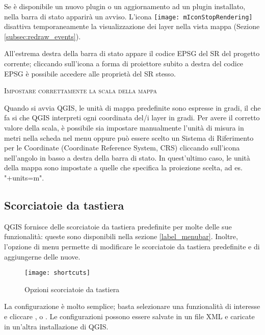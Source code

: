 Se è disponibile un nuovo plugin o un aggiornamento ad un plugin installato,
nella barra di stato apparirà un avviso. 
L'icona \texttt{[image: mIconStopRendering]} disattiva temporaneamente 
la visualizzazione dei layer nella vista mappa (Sezione \ref{subsec:redraw_events}). 

All'estrema destra della barra di stato appare il codice EPSG del SR del progetto corrente; cliccando sull'icona a forma di proiettore subito a destra del codice EPSG è possibile accedere alle proprietà del SR stesso. 

\begin{Tip}\caption{\textsc{Impostare correttamente la scala della mappa}}
Quando si avvia QGIS, le unità di mappa predefinite sono espresse in gradi, il che fa si
che QGIS interpreti ogni coordinata del/i layer in gradi. Per avere il corretto
valore della scala, è possibile sia impostare manualmente l'unità di misura in
metri nella scheda  nel menu  \arrow {} oppure può essere scelto un Sistema di Riferimento per le Coordinate (Coordinate Reference System, CRS) cliccando
sull'icona  nell'angolo in basso a destra della barra di stato. In quest'ultimo caso, le unità della mappa sono impostate a quelle che specifica la proiezione scelta, ad es. "+units=m".
\end{Tip}

\subsection{Scorciatoie da tastiera}\label{shortcuts}

QGIS fornisce delle scorciatoie da tastiera predefinite per molte delle sue funzionalità: queste sono disponibili nella sezione \ref{label_menubar}. Inoltre, l'opzione di menu  \arrow {} permette di modificare le scorciatoie da tastiera predefinite e di aggiungerne delle nuove.

\begin{figure}[ht]
   \centering
   \texttt{[image: shortcuts]}
   \caption{Opzioni scorciatoie da tastiera \nixcaption} \label{fig:shortcuts}
\end{figure}

La configurazione è molto semplice; basta selezionare una funzionalità di interesse e cliccare ,  o . Le configurazioni possono essere salvate in un file XML e caricate in un'altra installazione di QGIS.

